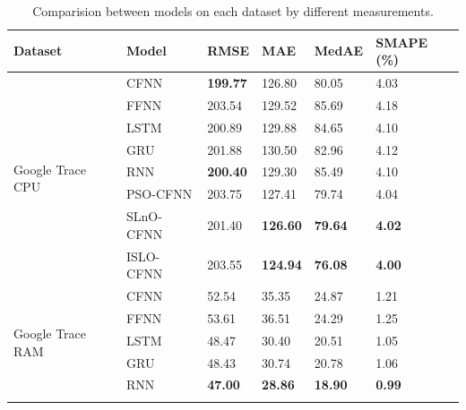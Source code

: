 \documentclass[a4paper,13pt,2p]{report}
\begin{document}
\begin{table}[!t]
\caption{Comparision between models on each dataset by different measurements.}
\label{tbl_result_app}
\centering
\begin{tabular}{|l|l|l|l|l|l|}
\hline
Dataset                              & Model     & RMSE            & MAE             & MedAE          & SMAPE (\%)    \\ \hline
\multirow{8}{*}{Google Trace CPU}    & CFNN      & \textbf{199.77}          & 126.80          & 80.05          & 4.03          \\ \cline{2-6} 
                                     & FFNN      & 203.54          & 129.52          & 85.69          & 4.18          \\ \cline{2-6} 
                                     & LSTM      & 200.89 & 129.88          & 84.65          & 4.10          \\ \cline{2-6} 
                                     & GRU       & 201.88          & 130.50          & 82.96          & 4.12          \\ \cline{2-6} 
                                     & RNN       & \textbf{200.40} & 129.30          & 85.49          & 4.10          \\ \cline{2-6} 
                                     & PSO-CFNN  & 203.75          & 127.41          & 79.74          & 4.04          \\ \cline{2-6} 
                                     & SLnO-CFNN & 201.40          & \textbf{126.60} & \textbf{79.64} & \textbf{4.02} \\ \cline{2-6} 
                                     & ISLO-CFNN & 203.55          & \textbf{124.94} & \textbf{76.08} & \textbf{4.00} \\ \hline
\multirow{8}{*}{Google Trace RAM}    & CFNN      & 52.54           & 35.35           & 24.87          & 1.21          \\ \cline{2-6} 
                                     & FFNN      & 53.61           & 36.51           & 24.29          & 1.25          \\ \cline{2-6} 
                                     & LSTM      & 48.47           & 30.40           & 20.51          & 1.05          \\ \cline{2-6} 
                                     & GRU       & 48.43           & 30.74           & 20.78          & 1.06          \\ \cline{2-6} 
                                     & RNN       & \textbf{47.00}  & \textbf{28.86}  & \textbf{18.90} & \textbf{0.99} \\ \cline{2-6} 

\end{tabular}
\end{table}
\end{document}
